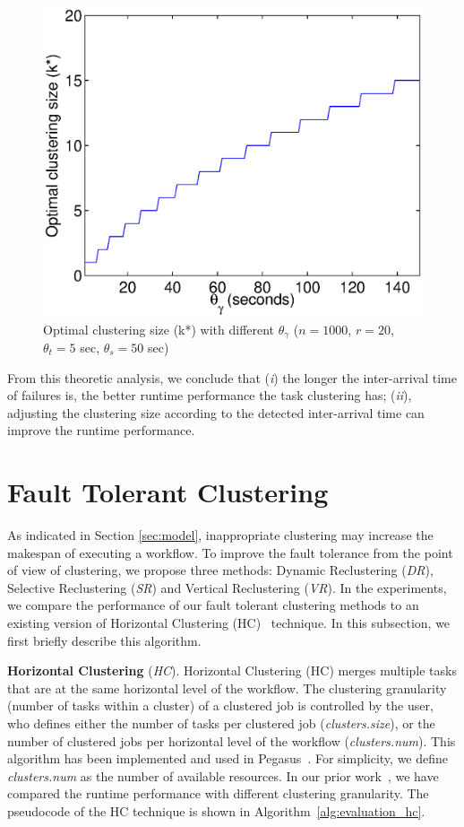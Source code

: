\documentclass{IOS-Book-Article}
\begin{document}
\begin{figure}[!htb]
\centering
  \includegraphics[width=0.75\linewidth]{model_size.eps}
  \caption{Optimal clustering size (k*) with different  $\theta_{\gamma}$ ($n=1000$, $r=20$, $\theta_t=5$ sec, $\theta_s=50$ sec)}
  \label{fig:model_size}
\end{figure}


From this theoretic analysis, we conclude that (\emph{i}) the longer the inter-arrival time of failures is, the better runtime performance the task clustering has; (\emph{ii}), adjusting the clustering size according to the detected inter-arrival time can improve the runtime performance. 

\section{Fault Tolerant Clustering}
\label{sec:clustering}

As indicated in Section \ref{sec:model}, inappropriate clustering may increase the makespan of executing a workflow. To improve the fault tolerance from the point of view of clustering, we propose three methods: Dynamic Reclustering (\emph{DR}), Selective Reclustering (\emph{SR}) and Vertical Reclustering (\emph{VR}). In the experiments, we compare the performance of our fault tolerant clustering methods to an existing version of Horizontal Clustering (HC)~\cite{Singh2008} technique. In this subsection, we first briefly describe this algorithm.

\textbf{Horizontal Clustering} (\emph{HC}). 
Horizontal Clustering (HC) merges multiple tasks that are at the same horizontal level of the workflow. The clustering granularity (number of tasks within a cluster) of a clustered job is controlled by the user, who defines either the number of tasks per clustered job (\emph{clusters.size}), or the number of clustered jobs per horizontal level of the workflow (\emph{clusters.num}). This algorithm has been implemented and used in Pegasus~\cite{Singh2008}. For simplicity, we define \emph{clusters.num} as the number of available resources. In our prior work~\cite{Chen2013a,Chen2013b}, we have compared the runtime performance with different clustering granularity. The pseudocode of the HC technique is shown in Algorithm~\ref{alg:evaluation_hc}. 
\end{document}
